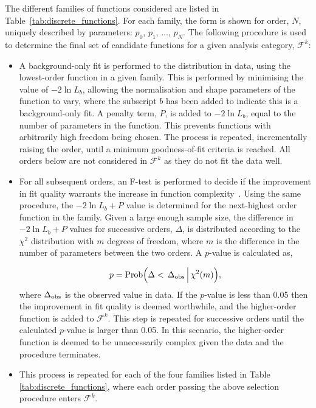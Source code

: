 The different families of functions considered are listed in Table~\ref{tab:discrete_functions}. For each family, the form is shown for order, $N$, uniquely described by parameters: $p_0$, $p_1$, ..., $p_N$. The following procedure is used to determine the final set of candidate functions for a given analysis category, $\mathcal{F}^k$:
\begin{itemize}
    \item A background-only fit is performed to the \mgg distribution in data, using the lowest-order function in a given family. This is performed by minimising the value of $-2\ln{L}_b$, allowing the normalisation and shape parameters of the function to vary, where the subscript $b$ has been added to indicate this is a background-only fit. A penalty term, $P$, is added to $-2\ln{L}_b$, equal to the number of parameters in the function. This prevents functions with arbitrarily high freedom being chosen. The process is repeated, incrementally raising the order, until a minimum goodness-of-fit criteria is reached. All orders below are not considered in $\mathcal{F}^k$ as they do not fit the data well.
    
    \item For all subsequent orders, an F-test is performed to decide if the improvement in fit quality warrants the increase in function complexity~\cite{}. Using the same procedure, the $-2\ln{L}_b+P$ value is determined for the next-highest order function in the family. Given a large enough sample size, the difference in $-2\ln{L}_b+P$ values for successive orders, $\Delta$, is distributed according to the $\chi^2$ distribution with $m$ degrees of freedom, where $m$ is the difference in the number of parameters between the two orders. A $p$-value is calculated as,
    
    \begin{equation}
        p = {\rm{Prob}}\Big(\Delta<\,\Delta_{\rm{obs}}\,\Big|\,\chi^2(m)\Big),
    \end{equation}
    \noindent
    where $\Delta_{\rm{obs}}$ is the observed value in data. If the $p$-value is less than 0.05 then the improvement in fit quality is deemed worthwhile, and the higher-order function is added to $\mathcal{F}^k$. This step is repeated for successive orders until the calculated $p$-value is larger than 0.05. In this scenario, the higher-order function is deemed to be unnecessarily complex given the data and the procedure terminates.

    \item This process is repeated for each of the four families listed in Table \ref{tab:discrete_functions}, where each order passing the above selection procedure enters $\mathcal{F}^k$.
\end{itemize}

